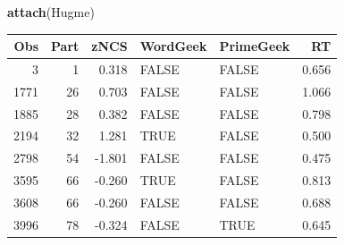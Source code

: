 \documentclass[]{svmono}
\newenvironment{Shaded}{\begin{snugshade}}{\end{snugshade}}
\newcommand{\KeywordTok}[1]{\textcolor[rgb]{0.13,0.29,0.53}{\textbf{#1}}}
\newcommand{\StringTok}[1]{\textcolor[rgb]{0.31,0.60,0.02}{#1}}
\newcommand{\OperatorTok}[1]{\textcolor[rgb]{0.81,0.36,0.00}{\textbf{#1}}}
\newcommand{\NormalTok}[1]{#1}
\theoremstyle{definition}
\theoremstyle{definition}
\theoremstyle{definition}
\theoremstyle{remark}
\begin{document}
\begin{Shaded}
\begin{Highlighting}[]
\KeywordTok{attach}\NormalTok{(Hugme)}
\end{Highlighting}
\end{Shaded}

\begin{Shaded}
\end{Shaded}

\begin{longtable}[]{@{}rrrllr@{}}
\toprule
Obs & Part & zNCS & WordGeek & PrimeGeek & RT\tabularnewline
\midrule
\endhead
3 & 1 & 0.318 & FALSE & FALSE & 0.656\tabularnewline
1771 & 26 & 0.703 & FALSE & FALSE & 1.066\tabularnewline
1885 & 28 & 0.382 & FALSE & FALSE & 0.798\tabularnewline
2194 & 32 & 1.281 & TRUE & FALSE & 0.500\tabularnewline
2798 & 54 & -1.801 & FALSE & FALSE & 0.475\tabularnewline
3595 & 66 & -0.260 & TRUE & FALSE & 0.813\tabularnewline
3608 & 66 & -0.260 & FALSE & FALSE & 0.688\tabularnewline
3996 & 78 & -0.324 & FALSE & TRUE & 0.645\tabularnewline
\bottomrule
\end{longtable}
\end{document}
